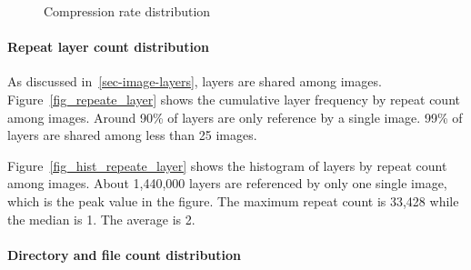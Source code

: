 \begin{figure}[!t]
	\centering
	\caption{Compression rate distribution}
	\label{fig-repeat-layer-cnt}
\end{figure}

\paragraph{Repeat layer count distribution}

As discussed in~\ref{sec-image-layers}, layers are shared among images. Figure~\ref{fig_repeate_layer} shows the cumulative layer frequency by repeat count among images. Around 90\% of layers are only reference by a single image. 99\% of layers are shared among less than 25 images. 

Figure~\ref{fig_hist_repeate_layer} shows the histogram of layers by repeat count among images. About 1,440,000 layers are referenced by only one single image, which is the peak value in the figure. The maximum repeat count is 33,428 while the median is 1. The average is 2.

\paragraph{Directory and file count distribution}

